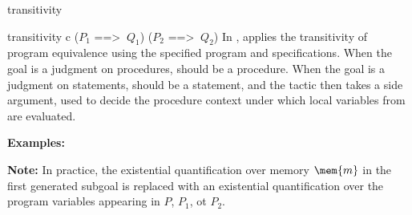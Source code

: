\begin{tactic}{transitivity}
  \begin{tsyntax}{transitivity c ($P_1$ ==> $\ Q_1$) ($P_2$ ==> $\ Q_2$)}
  In \prhl, applies the transitivity of program equivalence using the
  specified program and specifications. When the goal is a judgment on
  procedures,  should be a procedure. When the goal is a
  judgment on statements,  should be a statement, and the
  tactic then takes a side argument, used to decide the procedure
  context under which local variables from  are evaluated.

  \textbf{Examples:}

  \textbf{Note:} In practice, the existential quantification over
  memory $\mem{m}$ in the first generated subgoal is replaced with an
  existential quantification over the program variables appearing in $P$,
  $P_1$, ot $P_2$.
  \end{tsyntax}
\end{tactic}
